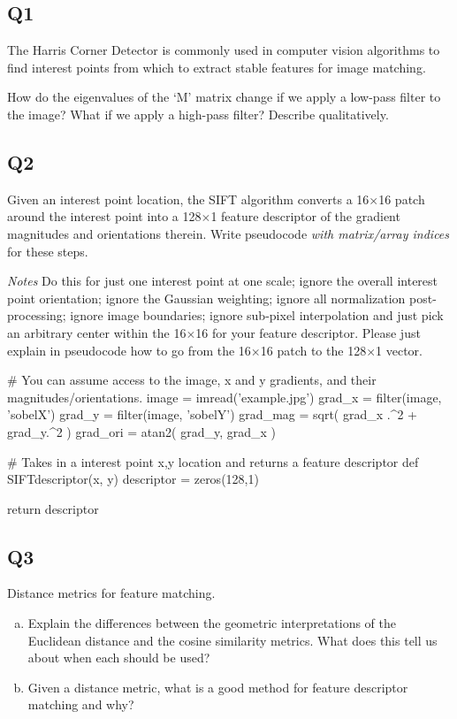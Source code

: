 \documentclass{article}
\begin{document}
\subsection{Q1} 
The Harris Corner Detector is commonly used in computer vision algorithms to find interest points from which to extract stable features for image matching. 

How do the eigenvalues of the `M' matrix change if we apply a low-pass filter to the image? What if we apply a high-pass filter? Describe qualitatively. 





    








\subsection{Q2} Given an interest point location, the SIFT algorithm converts a 16$\times$16 patch around the interest point into a 128$\times$1 feature descriptor of the gradient magnitudes and orientations therein. Write pseudocode \emph{with matrix/array indices} for these steps.


\emph{Notes} Do this for just one interest point at one scale; ignore the overall interest point orientation; ignore the Gaussian weighting; ignore all normalization post-processing; ignore image boundaries; ignore sub-pixel interpolation and just pick an arbitrary center within the 16$\times$16 for your feature descriptor. Please just explain in pseudocode how to go from the 16$\times$16 patch to the 128$\times$1 vector.
\begin{python}
    # You can assume access to the image, x and y gradients, and their magnitudes/orientations.
    image = imread('example.jpg')
    grad_x = filter(image, 'sobelX')
    grad_y = filter(image, 'sobelY')
    grad_mag = sqrt( grad_x .^2 + grad_y.^2 )
    grad_ori = atan2( grad_y, grad_x )
    
    # Takes in a interest point x,y location and returns a feature descriptor
    def SIFTdescriptor(x, y)
        descriptor = zeros(128,1)
    
    
        return descriptor
    \end{python}
    
\subsection{Q3} Distance metrics for feature matching.

\begin{enumerate}[(a)]
    \item Explain the differences between the geometric interpretations of the Euclidean distance and the cosine similarity metrics. What does this tell us about when each should be used?
    \item Given a distance metric, what is a good method for feature descriptor matching and why?
\end{enumerate}
\end{document}
